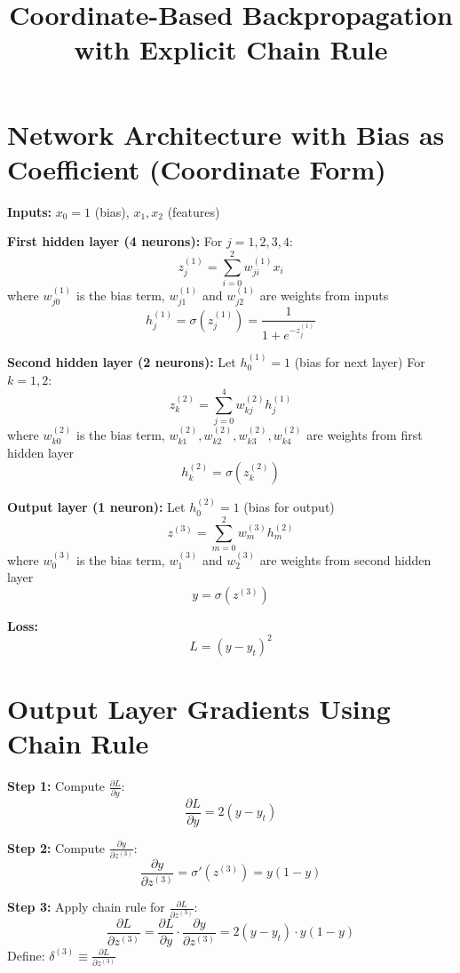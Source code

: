 \documentclass{article}
\begin{document}
\title{Coordinate-Based Backpropagation with Explicit Chain Rule}
\author{}
\date{}
\maketitle

\section{Network Architecture with Bias as Coefficient (Coordinate Form)}

\textbf{Inputs:} \( x_0 = 1 \) (bias), \( x_1, x_2 \) (features)

\textbf{First hidden layer (4 neurons):}
For \( j = 1,2,3,4 \):
\[
z_j^{(1)} = \sum_{i=0}^{2} w_{ji}^{(1)} x_i
\]
where \( w_{j0}^{(1)} \) is the bias term, \( w_{j1}^{(1)} \) and \( w_{j2}^{(1)} \) are weights from inputs
\[
h_j^{(1)} = \sigma(z_j^{(1)}) = \frac{1}{1 + e^{-z_j^{(1)}}}
\]

\textbf{Second hidden layer (2 neurons):}
Let \( h_0^{(1)} = 1 \) (bias for next layer)
For \( k = 1,2 \):
\[
z_k^{(2)} = \sum_{j=0}^{4} w_{kj}^{(2)} h_j^{(1)}
\]
where \( w_{k0}^{(2)} \) is the bias term, \( w_{k1}^{(2)}, w_{k2}^{(2)}, w_{k3}^{(2)}, w_{k4}^{(2)} \) are weights from first hidden layer
\[
h_k^{(2)} = \sigma(z_k^{(2)})
\]

\textbf{Output layer (1 neuron):}
Let \( h_0^{(2)} = 1 \) (bias for output)
\[
z^{(3)} = \sum_{m=0}^{2} w_m^{(3)} h_m^{(2)}
\]
where \( w_0^{(3)} \) is the bias term, \( w_1^{(3)} \) and \( w_2^{(3)} \) are weights from second hidden layer
\[
y = \sigma(z^{(3)})
\]

\textbf{Loss:}
\[
L = (y - y_t)^2
\]

\section{Output Layer Gradients Using Chain Rule}

\textbf{Step 1:} Compute \( \frac{\partial L}{\partial y} \):
\[
\frac{\partial L}{\partial y} = 2(y - y_t)
\]

\textbf{Step 2:} Compute \( \frac{\partial y}{\partial z^{(3)}} \):
\[
\frac{\partial y}{\partial z^{(3)}} = \sigma'(z^{(3)}) = y(1-y)
\]

\textbf{Step 3:} Apply chain rule for \( \frac{\partial L}{\partial z^{(3)}} \):
\[
\frac{\partial L}{\partial z^{(3)}} = \frac{\partial L}{\partial y} \cdot \frac{\partial y}{\partial z^{(3)}} = 2(y - y_t) \cdot y(1-y)
\]
Define: \( \delta^{(3)} \equiv \frac{\partial L}{\partial z^{(3)}} \)
\end{document}
